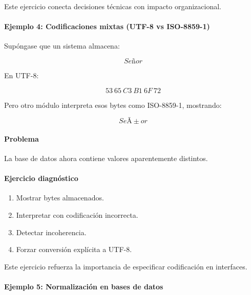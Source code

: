 \documentclass[12pt,twoside]{book}
\begin{document}
						\noindent
						Este ejercicio conecta decisiones técnicas con impacto organizacional.
						
						\paragraph{Ejemplo 4: Codificaciones mixtas (UTF-8 vs ISO-8859-1)}
						
						\noindent
						Supóngase que un sistema almacena:
						
						\[
						Señor
						\]
						
						En UTF-8:
						
						\[
						53\ 65\ C3\ B1\ 6F\ 72
						\]
						
						Pero otro módulo interpreta esos bytes como ISO-8859-1, mostrando:
						
						\[
						SeÃ±or
						\]
						
						\paragraph{Problema}
						
						La base de datos ahora contiene valores aparentemente distintos.
						
						\paragraph{Ejercicio diagnóstico}
						
						\begin{enumerate}
							\item Mostrar bytes almacenados.
							\item Interpretar con codificación incorrecta.
							\item Detectar incoherencia.
							\item Forzar conversión explícita a UTF-8.
						\end{enumerate}
						
						\noindent
						Este ejercicio refuerza la importancia de especificar codificación en interfaces.
						
						\paragraph{Ejemplo 5: Normalización en bases de datos}
						
\end{document}
